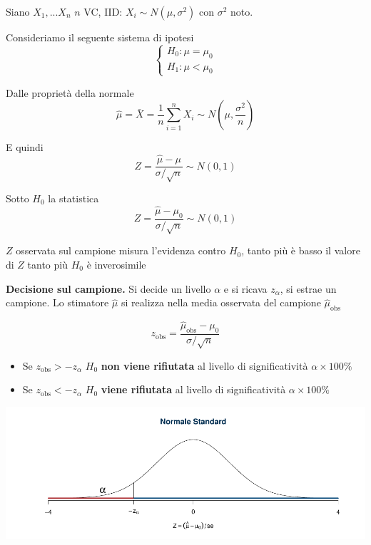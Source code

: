 \documentclass[
  11pt,
]{book}
\providecommand{\tightlist}{%
  \setlength{\itemsep}{0pt}\setlength{\parskip}{0pt}}
\theoremstyle{mytheoremstyle}
\theoremstyle{mydefstyle}
\begin{document}
Siano \(X_1,...X_n\) \(n\) VC, IID: \(X_i\sim N(\mu,\sigma^2)\) con \(\sigma^2\)
noto.

Consideriamo il seguente sistema di ipotesi \[\begin{cases}
H_0:\mu=\mu_0\\
H_1:\mu<\mu_0
\end{cases}\]

Dalle proprietà della normale
\[\hat\mu=\bar X=\frac 1 n\sum_{i=1}^nX_i\sim N\left(\mu,\frac{\sigma^2} {n}\right)\]

E quindi \[Z=\frac{\hat\mu-\mu}{\sigma/\sqrt n}\sim N(0,1)\]

Sotto \(H_0\) la statistica
\[Z=\frac{\hat\mu-\mu_0}{\sigma/\sqrt n}\sim N(0,1)\]

\(Z\) osservata sul campione misura l'evidenza contro \(H_0\), tanto più è
basso il valore di \(Z\) tanto più \(H_0\) è inverosimile

\begin{info}

\textbf{Decisione sul campione.} Si decide un livello \(\alpha\) e si ricava
\(z_\alpha\), si estrae un campione. Lo stimatore \(\hat\mu\) si realizza
nella media osservata del campione \(\hat\mu_\text{obs}\)

\[z_{\text{obs}}=\frac{\hat\mu_\text{obs} -\mu_0}{\sigma/\sqrt n}\]

\begin{itemize}
\tightlist
\item
  Se \(z_{\text{obs}}>-z_\alpha\) \(H_0\) \textbf{non viene rifiutata} al
  livello di significatività \(\alpha\times100\%\)
\item
  Se \(z_{\text{obs}}<-z_\alpha\) \(H_0\) \textbf{viene rifiutata} al livello
  di significatività \(\alpha\times100\%\)
\end{itemize}

\begin{center}\includegraphics{Appunti_di_Statistica_2025_files/figure-latex/15-test-mu-pi-17-1} \end{center}

\end{info}
\end{document}

